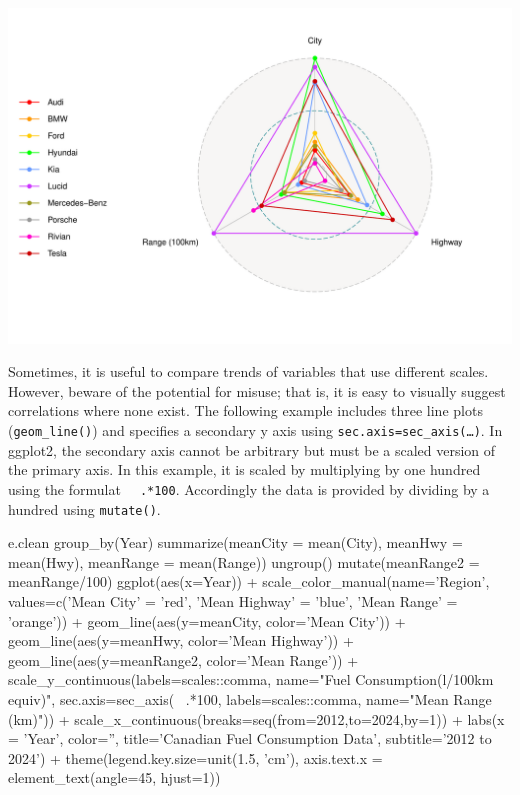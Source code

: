 \begin{center}
  \includegraphics[width=.75\textwidth]{fuel.radar.pdf}
\end{center}

Sometimes, it is useful to compare trends of variables that use different scales. However, beware of the potential for misuse; that is, it is easy to visually suggest correlations where none exist. The following example includes three line plots (\texttt{geom\_line()}) and specifies a secondary y axis using \texttt{sec.axis=sec\_axis(\ldots)}. In ggplot2, the secondary axis cannot be arbitrary but must be a scaled version of the primary axis. In this example, it is scaled by multiplying by one hundred using the formulat \texttt{~ .*100}. Accordingly the data is provided by dividing by a hundred using \texttt{mutate()}.

\begin{Rcode}
e.clean %
   group_by(Year) %
   summarize(meanCity = mean(City), 
             meanHwy = mean(Hwy), 
             meanRange = mean(Range)) %
   ungroup() %
   mutate(meanRange2 = meanRange/100) %
ggplot(aes(x=Year)) +
  scale_color_manual(name='Region', 
     values=c('Mean City' = 'red', 
              'Mean Highway' = 'blue', 
              'Mean Range' = 'orange')) +
  geom_line(aes(y=meanCity, color='Mean City')) + 
  geom_line(aes(y=meanHwy, color='Mean Highway')) +
  geom_line(aes(y=meanRange2, color='Mean Range')) +
  scale_y_continuous(labels=scales::comma, 
      name="Fuel Consumption\n(l/100km equiv)", 
      sec.axis=sec_axis(~ .*100, 
                        labels=scales::comma, 
                        name="Mean Range (km)")) + 
  scale_x_continuous(breaks=seq(from=2012,to=2024,by=1)) + 
  labs(x = 'Year', color='',
       title='Canadian Fuel Consumption Data', 
       subtitle='2012 to 2024') +
  theme(legend.key.size=unit(1.5, 'cm'), 
        axis.text.x = element_text(angle=45, hjust=1))
\end{Rcode}

